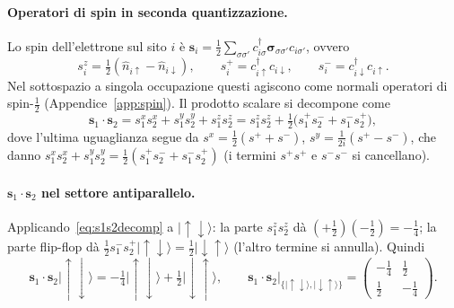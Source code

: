 \documentclass[11pt,a4paper]{article}
\newcommand{\ket}[1]{\lvert #1 \rangle}
\newcommand{\up}{\uparrow}
\newcommand{\dn}{\downarrow}
\newcommand{\dg}{\dagger}
\renewcommand{\vec}[1]{\boldsymbol{#1}}
\newcommand{\sv}{\vec{s}}
\newcommand{\opn}{\hat{n}}
\theoremstyle{definition}
\theoremstyle{remark}
\begin{document}
\paragraph{Operatori di spin in seconda quantizzazione.} Lo spin dell'elettrone sul sito $i$ è
$\sv_i=\tfrac12\sum_{\sigma\sigma'}c_{i\sigma}^{\dg}\boldsymbol{\sigma}_{\sigma\sigma'}c_{i\sigma'}$, ovvero
\begin{equation}
s_i^z=\tfrac12(\opn_{i\up}-\opn_{i\dn}),\qquad s_i^+=c_{i\up}^{\dg}c_{i\dn},\qquad s_i^-=c_{i\dn}^{\dg}c_{i\up}.
\end{equation}
Nel sottospazio a singola occupazione questi agiscono come normali operatori di spin-$\tfrac12$
(Appendice~\ref{app:spin}). Il prodotto scalare si decompone come
\begin{equation}
\sv_1\!\cdot\sv_2=s_1^xs_2^x+s_1^ys_2^y+s_1^zs_2^z=s_1^zs_2^z+\tfrac12\big(s_1^+s_2^-+s_1^-s_2^+\big),
\label{eq:s1s2decomp}
\end{equation}
dove l'ultima uguaglianza segue da $s^x=\tfrac12(s^++s^-)$, $s^y=\tfrac1{2i}(s^+-s^-)$, che danno
$s_1^xs_2^x+s_1^ys_2^y=\tfrac12(s_1^+s_2^-+s_1^-s_2^+)$ (i termini $s^+s^+$ e $s^-s^-$ si cancellano).

\paragraph{$\sv_1\!\cdot\sv_2$ nel settore antiparallelo.} Applicando~\eqref{eq:s1s2decomp} a $\ket{\up\dn}$:
la parte $s_1^zs_2^z$ dà $(+\tfrac12)(-\tfrac12)=-\tfrac14$; la parte flip-flop dà
$\tfrac12 s_1^-s_2^+\ket{\up\dn}=\tfrac12\ket{\dn\up}$ (l'altro termine si annulla). Quindi
\begin{equation}
\sv_1\!\cdot\sv_2\ket{\up\dn}=-\tfrac14\ket{\up\dn}+\tfrac12\ket{\dn\up},\qquad
\sv_1\!\cdot\sv_2\big|_{\{\ket{\up\dn},\ket{\dn\up}\}}=\begin{pmatrix}-\tfrac14 & \tfrac12\\[2pt] \tfrac12 & -\tfrac14\end{pmatrix}.
\end{equation}
\end{document}
